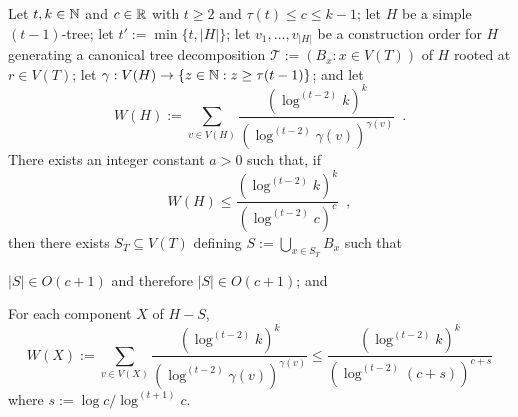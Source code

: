 \documentclass[kpfonts]{patmorin}
\theoremstyle{named}
\begin{document}
\begin{lem}\label{t-tree-no-slack-separator}
    Let $t,k\in\mathbb{N}$ and $c\in\mathbb{R}$ with $t\ge 2$ and $\tau(t)\le c\le k-1$; let $H$ be a simple $(t-1)$-tree; let $t':=\min\{t, |H|\}$; let $v_1,\ldots,v_{|H|}$ be a construction order for $H$ generating a canonical tree decomposition $\mathcal{T}:=(B_x:x\in V(T))$ of $H$ rooted at $r\in V(T)$; let $\gamma:V(H)\to\{z\in\mathbb{N}: z\ge \tau(t-1)\}$; and let
    \[
        W(H):=\sum_{v\in V(H)} \frac{\left(\log^{(t-2)} k\right)^k}{\left(\log^{(t-2)} \gamma(v)\right)^{\gamma(v)}} \enspace .
    \]
    There exists an integer constant $a>0$ such that,
    if
    \begin{equation}
         W(H) \le \frac{(\log^{(t-2)} k)^k}{(\log^{(t-2)} c)^{c}} \enspace ,
     \label{total-weight-ii}
    \end{equation}
    then there exists $S_T\subseteq V(T)$ defining $S:=\bigcup_{x\in S_T} B_x$ such that
    \begin{compactenum}
        \item $|S|\in O(c+1)$ and therefore $|S|\in O(c+1)$; and
        \item For each component $X$ of $H-S$,
        \[
            W(X):=\sum_{v\in V(X)} \frac{\left(\log^{(t-2)} k\right)^k}{\left(\log^{(t-2)} \gamma(v)\right)^{\gamma(v)}}
            \le %
            \frac{\left(\log^{(t-2)} k\right)^k}{\left(\log^{(t-2)} (c+s)\right)^{c+s}}
        \]
        where $s:=\log c/\log^{(t+1)} c$.
    \end{compactenum}
\end{lem}
\end{document}
